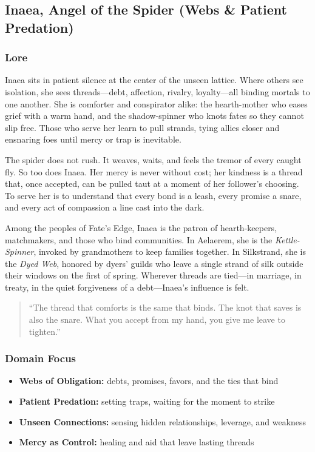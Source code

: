 
\subsection{Inaea, Angel of the Spider (Webs \& Patient Predation)}

\subsubsection*{Lore}
Inaea sits in patient silence at the center of the unseen lattice. Where others see isolation, she sees threads---debt, affection, rivalry, loyalty---all binding mortals to one another. She is comforter and conspirator alike: the hearth-mother who eases grief with a warm hand, and the shadow-spinner who knots fates so they cannot slip free. Those who serve her learn to pull strands, tying allies closer and ensnaring foes until mercy or trap is inevitable.

The spider does not rush. It weaves, waits, and feels the tremor of every caught fly. So too does Inaea. Her mercy is never without cost; her kindness is a thread that, once accepted, can be pulled taut at a moment of her follower's choosing. To serve her is to understand that every bond is a leash, every promise a snare, and every act of compassion a line cast into the dark.

Among the peoples of Fate's Edge, Inaea is the patron of hearth-keepers, matchmakers, and those who bind communities. In Aelaerem, she is the \textit{Kettle-Spinner}, invoked by grandmothers to keep families together. In Silkstrand, she is the \textit{Dyed Web}, honored by dyers' guilds who leave a single strand of silk outside their windows on the first of spring. Wherever threads are tied---in marriage, in treaty, in the quiet forgiveness of a debt---Inaea's influence is felt.

\begin{quote}
``The thread that comforts is the same that binds. The knot that saves is also the snare. What you accept from my hand, you give me leave to tighten.''
\end{quote}

\subsubsection*{Domain Focus}
\begin{itemize}
  \item \textbf{Webs of Obligation:} debts, promises, favors, and the ties that bind
  \item \textbf{Patient Predation:} setting traps, waiting for the moment to strike
  \item \textbf{Unseen Connections:} sensing hidden relationships, leverage, and weakness
  \item \textbf{Mercy as Control:} healing and aid that leave lasting threads
\end{itemize}

